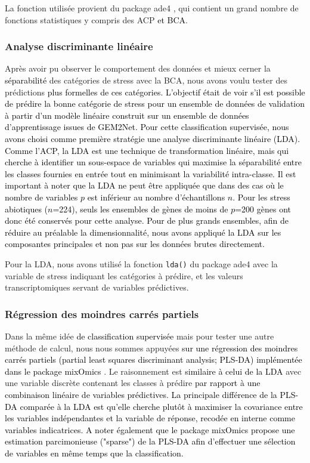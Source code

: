 \documentclass[twoside]{article}
\newcommand{\AR}[1]{\textcolor{black}{#1}}
\begin{document}
    \vspace{0.3cm}La fonction utilisée provient du package ade4 \cite{dray_ade4_2007}, qui contient un grand nombre de fonctions statistiques y compris des ACP \AR{et BCA}.

    \subsubsection{Analyse discriminante linéaire}
    
    Après avoir pu observer le comportement des données et mieux cerner la \AR{séparabilité} des catégories de stress avec la BCA, nous avons voulu tester des prédictions \AR{plus formelles de ces catégories. L'objectif était de voir s'il est possible de prédire la bonne catégorie de stress pour un ensemble de données de validation à partir d'un modèle linéaire construit sur un ensemble de données d'apprentissage issues de GEM2Net. Pour cette classification supervisée, nous avons choisi comme première stratégie une analyse discriminante linéaire (LDA). Comme l'ACP, la LDA est une technique de transformation linéaire, mais qui cherche à identifier un sous-espace de variables qui maximise la séparabilité entre les classes fournies en entrée tout en minimisant la variabilité intra-classe.
    Il est important à noter que la LDA ne peut être appliquée que dans des cas où le nombre de variables $p$ est inférieur au nombre d'échantillons $n$. Pour les stress abiotiques ($n$=224), seuls les ensembles de gènes de moins de $p$=200 gènes ont donc été conservés pour cette analyse. Pour de plus grands ensembles, afin de réduire au préalable la dimensionnalité, nous avons appliqué la LDA sur les composantes principales et non pas sur les données brutes directement. }
    
    \vspace{0.5cm}Pour la LDA, nous avons utilisé la fonction \texttt{lda()} du package ade4 avec la variable de stress indiquant les catégories à prédire, et les valeurs transcriptomiques servant de variables prédictives.
    
    \subsubsection{Régression des moindres carrés partiels }
    
    Dans la même idée \AR{de classification supervisée} mais pour tester une autre méthode de calcul, nous nous sommes appuyées \AR{sur une régression des moindres carrés partiels (partial least squares discriminant analysis; PLS-DA) implémentée dans le package mixOmics \cite{rohart_mixomics_2017}}. Le raisonnement est \AR{similaire à celui de la LDA} avec une variable discrète contenant les classes à prédire \AR{par rapport à une combinaison linéaire de variables prédictives. La principale différence de la PLS-DA comparée à la LDA est qu'elle cherche plutôt à maximiser la covariance entre les variables indépendantes et la variable de réponse, recodée en interne comme variables indicatrices. A noter également que le package mixOmics propose une estimation parcimonieuse ("sparse") de la PLS-DA afin d'effectuer une sélection de variables en même temps que la classification.}
    
\end{document}
